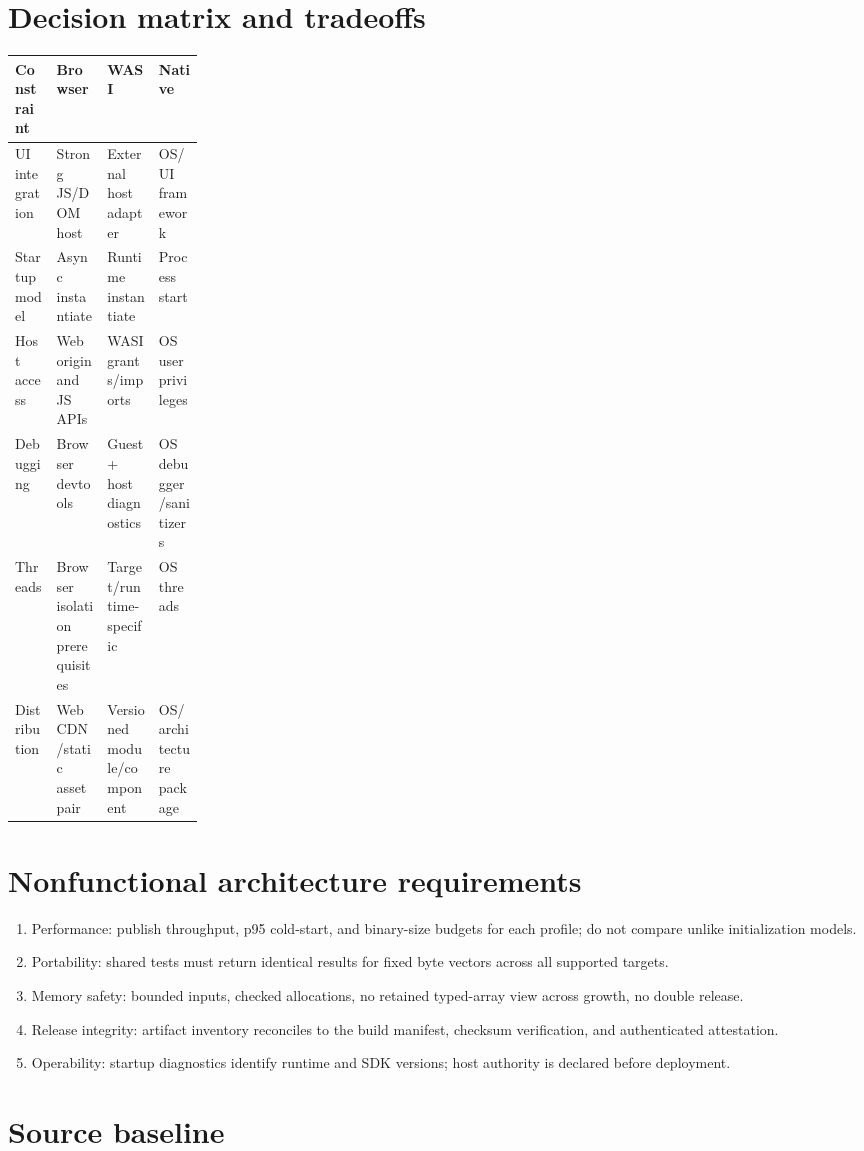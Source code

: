 \documentclass[11pt,letterpaper]{article}
\begin{document}
\section{Decision matrix and tradeoffs}
\noindent\begin{tabularx}{\linewidth}{p{0.22\linewidth}XXX}
\toprule Constraint & Browser & WASI & Native \\ \midrule
UI integration & Strong JS/DOM host & External host adapter & OS/UI framework \\
Startup model & Async instantiate & Runtime instantiate & Process start \\
Host access & Web origin and JS APIs & WASI grants/imports & OS user privileges \\
Debugging & Browser devtools & Guest + host diagnostics & OS debugger/sanitizers \\
Threads & Browser isolation prerequisites & Target/runtime-specific & OS threads \\
Distribution & Web CDN/static asset pair & Versioned module/component & OS/architecture package \\
\bottomrule
\end{tabularx}

\section{Nonfunctional architecture requirements}
\begin{enumerate}
\item Performance: publish throughput, p95 cold-start, and binary-size budgets for each profile; do not compare unlike initialization models.
\item Portability: shared tests must return identical results for fixed byte vectors across all supported targets.
\item Memory safety: bounded inputs, checked allocations, no retained typed-array view across growth, no double release.
\item Release integrity: artifact inventory reconciles to the build manifest, checksum verification, and authenticated attestation.
\item Operability: startup diagnostics identify runtime and SDK versions; host authority is declared before deployment.
\end{enumerate}

\section{Source baseline}
\end{document}
